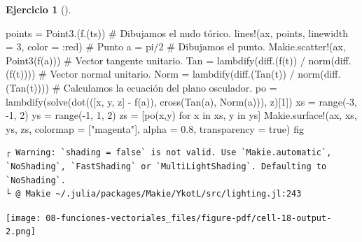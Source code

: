 \documentclass[
  a4paper,
]{scrreport}
\newenvironment{Shaded}{\begin{snugshade}}{\end{snugshade}}
\newcommand{\CommentTok}[1]{\textcolor[rgb]{0.37,0.37,0.37}{#1}}
\newcommand{\ConstantTok}[1]{\textcolor[rgb]{0.56,0.35,0.01}{#1}}
\newcommand{\FloatTok}[1]{\textcolor[rgb]{0.68,0.00,0.00}{#1}}
\newcommand{\FunctionTok}[1]{\textcolor[rgb]{0.28,0.35,0.67}{#1}}
\newcommand{\KeywordTok}[1]{\textcolor[rgb]{0.00,0.23,0.31}{#1}}
\newcommand{\NormalTok}[1]{\textcolor[rgb]{0.00,0.23,0.31}{#1}}
\newcommand{\OperatorTok}[1]{\textcolor[rgb]{0.37,0.37,0.37}{#1}}
\newcommand{\StringTok}[1]{\textcolor[rgb]{0.13,0.47,0.30}{#1}}
\theoremstyle{definition}
\newtheorem{exercise}{Ejercicio}[chapter]
\theoremstyle{remark}
\begin{document}
\begin{exercise}[]
\begin{tcolorbox}
\begin{Shaded}
\begin{Highlighting}[]
\NormalTok{points }\OperatorTok{=} \FunctionTok{Point3}\NormalTok{.(}\FunctionTok{f}\NormalTok{.(ts))}
\CommentTok{\# Dibujamos el nudo tórico.}
\FunctionTok{lines!}\NormalTok{(ax, points, linewidth }\OperatorTok{=} \FloatTok{3}\NormalTok{, color }\OperatorTok{=} \OperatorTok{:}\NormalTok{red)}
\CommentTok{\# Punto}
\NormalTok{a }\OperatorTok{=} \ConstantTok{pi}\OperatorTok{/}\FloatTok{2}
\CommentTok{\# Dibujamos el punto.}
\NormalTok{Makie.}\FunctionTok{scatter!}\NormalTok{(ax, }\FunctionTok{Point3}\NormalTok{(}\FunctionTok{f}\NormalTok{(a)))}
\CommentTok{\# Vector tangente unitario.}
\NormalTok{Tan }\OperatorTok{=} \FunctionTok{lambdify}\NormalTok{(}\FunctionTok{diff}\NormalTok{.(}\FunctionTok{f}\NormalTok{(t)) }\OperatorTok{/} \FunctionTok{norm}\NormalTok{(}\FunctionTok{diff}\NormalTok{.(}\FunctionTok{f}\NormalTok{(t))))}
\CommentTok{\# Vector normal unitario.}
\NormalTok{Norm }\OperatorTok{=} \FunctionTok{lambdify}\NormalTok{(}\FunctionTok{diff}\NormalTok{.(}\FunctionTok{Tan}\NormalTok{(t)) }\OperatorTok{/} \FunctionTok{norm}\NormalTok{(}\FunctionTok{diff}\NormalTok{.(}\FunctionTok{Tan}\NormalTok{(t))))}
\CommentTok{\# Calculamos la ecuación del plano osculador.}
\NormalTok{po }\OperatorTok{=} \FunctionTok{lambdify}\NormalTok{(}\FunctionTok{solve}\NormalTok{(}\FunctionTok{dot}\NormalTok{(([x, y, z] }\OperatorTok{{-}} \FunctionTok{f}\NormalTok{(a)), }\FunctionTok{cross}\NormalTok{(}\FunctionTok{Tan}\NormalTok{(a), }\FunctionTok{Norm}\NormalTok{(a))), z)[}\FloatTok{1}\NormalTok{])}
\NormalTok{xs }\OperatorTok{=} \FunctionTok{range}\NormalTok{(}\OperatorTok{{-}}\FloatTok{3}\NormalTok{, }\OperatorTok{{-}}\FloatTok{1}\NormalTok{, }\FloatTok{2}\NormalTok{)}
\NormalTok{ys }\OperatorTok{=} \FunctionTok{range}\NormalTok{(}\OperatorTok{{-}}\FloatTok{1}\NormalTok{, }\FloatTok{1}\NormalTok{, }\FloatTok{2}\NormalTok{)}
\NormalTok{zs }\OperatorTok{=}\NormalTok{ [}\FunctionTok{po}\NormalTok{(x,y) for x }\KeywordTok{in}\NormalTok{ xs, y }\KeywordTok{in}\NormalTok{ ys]}
\NormalTok{Makie.}\FunctionTok{surface!}\NormalTok{(ax, xs, ys, zs, colormap }\OperatorTok{=}\NormalTok{ [}\StringTok{"magenta"}\NormalTok{], alpha }\OperatorTok{=} \FloatTok{0.8}\NormalTok{, transparency }\OperatorTok{=} \ConstantTok{true}\NormalTok{)}
\NormalTok{fig}
\end{Highlighting}
\end{Shaded}

\begin{verbatim}
┌ Warning: `shading = false` is not valid. Use `Makie.automatic`, `NoShading`, `FastShading` or `MultiLightShading`. Defaulting to `NoShading`.
└ @ Makie ~/.julia/packages/Makie/YkotL/src/lighting.jl:243
\end{verbatim}

\texttt{[image: 08-funciones-vectoriales\_files/figure-pdf/cell-18-output-2.png]}

\end{tcolorbox}

\end{exercise}
\end{document}
